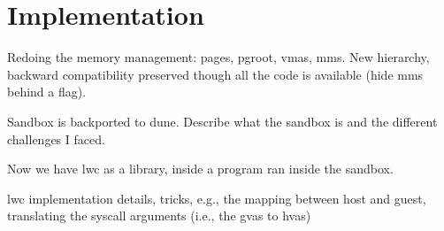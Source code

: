 \chapter{Implementation}
Redoing the memory management:
pages, pgroot, vmas, mms. New hierarchy, backward compatibility preserved though
all the code is available (hide mms behind a flag).

Sandbox is backported to dune.
Describe what the sandbox is and the different challenges I faced.

Now we have lwc as a library, inside a program ran inside the sandbox.

lwc implementation details, tricks, e.g., the mapping between host and guest,
translating the syscall arguments (i.e., the gvas to hvas)


